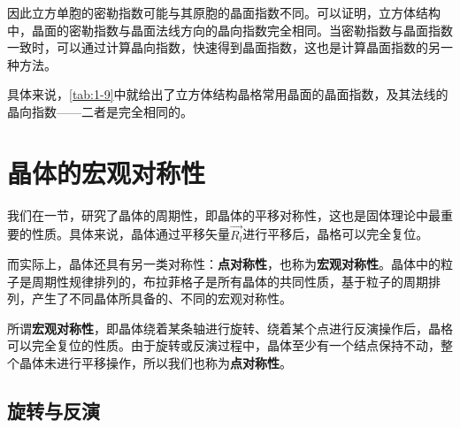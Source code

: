     因此立方单胞的密勒指数可能与其原胞的晶面指数不同。可以证明，立方体结构中，晶面的密勒指数与晶面法线方向的晶向指数完全相同。当密勒指数与晶面指数一致时，可以通过计算晶向指数，快速得到晶面指数，这也是计算晶面指数的另一种方法。
    
    具体来说，\autoref{tab:1-9}中就给出了立方体结构晶格常用晶面的晶面指数，及其法线的晶向指数——二者是完全相同的。

\section{晶体的宏观对称性}
    我们在一节，研究了晶体的周期性，即晶体的平移对称性，这也是固体理论中最重要的性质。具体来说，晶体通过平移矢量$\vec{R_l}$进行平移后，晶格可以完全复位。
    
    而实际上，晶体还具有另一类对称性：\textbf{点对称性}，也称为\textbf{宏观对称性}。晶体中的粒子是周期性规律排列的，布拉菲格子是所有晶体的共同性质，基于粒子的周期排列，产生了不同晶体所具备的、不同的宏观对称性。

    所谓\textbf{宏观对称性}\label{宏观对称性}，即晶体绕着某条轴进行旋转、绕着某个点进行反演操作后，晶格可以完全复位的性质。由于旋转或反演过程中，晶体至少有一个结点保持不动，整个晶体未进行平移操作，所以我们也称为\textbf{点对称性}\label{点对称性}。
    
\subsection{旋转与反演}
